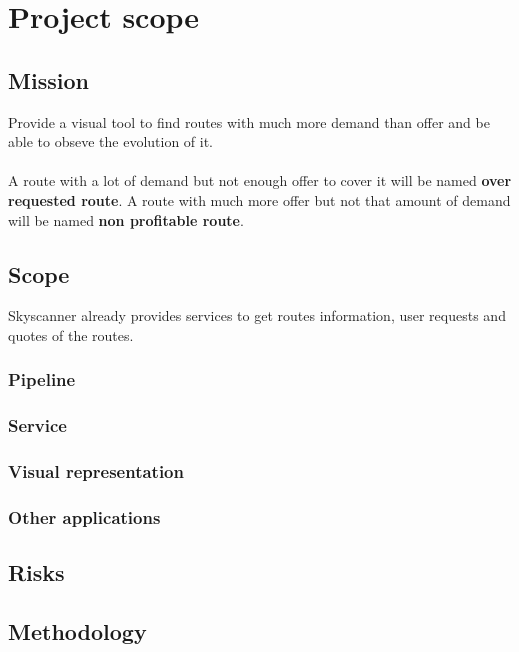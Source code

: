 
\chapter{Project scope}

\label{chapter03}

\section{Mission}

Provide a visual tool to find routes with much more demand than offer and be able to obseve the evolution of it.
\\\\
A route with a lot of demand but not enough offer to cover it will be named \textbf{over requested route}. A route with much more offer but not that amount of demand will be named \textbf{non profitable route}.

\section{Scope}

Skyscanner already provides services to get routes information, user requests and quotes of the routes.

\subsection{Pipeline}

\subsection{Service}

\subsection{Visual representation}

\subsection{Other applications}

\section{Risks}



\section{Methodology}

